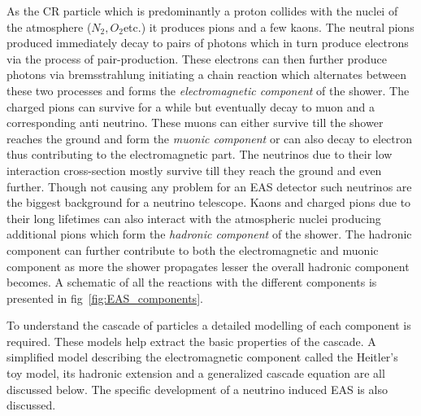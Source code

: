 As the CR particle which is predominantly a proton collides with the nuclei of the atmosphere ($N_2, O_2 $etc.) it produces pions and a few kaons. The neutral pions produced immediately decay to pairs of photons which in turn produce electrons via the process of pair-production. These electrons can then further produce photons via bremsstrahlung initiating a chain reaction which alternates between these two processes and forms the \textit{electromagnetic component} of the shower. The charged pions can survive for a while but eventually decay to muon and a corresponding anti neutrino. These muons can either survive till the shower reaches the ground and form the \textit{muonic component} or can also decay to electron thus contributing to the electromagnetic part. The neutrinos due to their low interaction cross-section mostly survive till they reach the ground and even further. Though not causing any problem for an EAS detector such neutrinos are the biggest background for a neutrino telescope. Kaons and charged pions due to their long lifetimes can also interact with the atmospheric nuclei producing additional pions which form the \textit{hadronic component} of the shower. The hadronic component can further contribute to both the electromagnetic and muonic component as more the shower propagates lesser the overall hadronic component becomes. A schematic of all the reactions with the different components is presented in fig~\ref{fig:EAS_components}.

To understand the cascade of particles a detailed modelling of each component is required. These models help extract the basic properties of the cascade. A simplified model describing the electromagnetic component called the Heitler's toy model, its hadronic extension and a generalized cascade equation are all discussed below. The specific development of a neutrino induced EAS is also discussed.  

